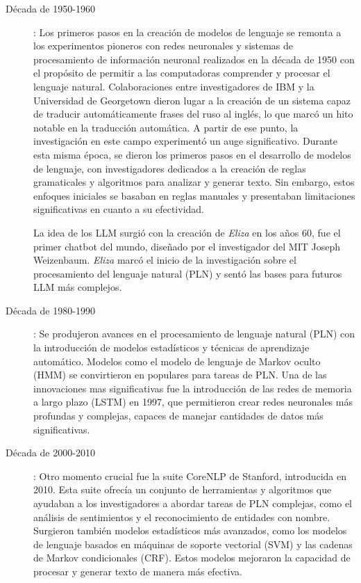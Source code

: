 \begin{description}

\item[Década de 1950-1960]: Los primeros pasos en la creación de modelos de lenguaje se remonta a los experimentos pioneros con redes neuronales y sistemas de procesamiento de información neuronal realizados en la década de 1950 con el propósito de permitir a las computadoras comprender y procesar el lenguaje natural. Colaboraciones entre investigadores de IBM y la Universidad de Georgetown dieron lugar a la creación de un sistema capaz de traducir automáticamente frases del ruso al inglés, lo que marcó un hito notable en la traducción automática. A partir de ese punto, la investigación en este campo experimentó un auge significativo. Durante esta misma época, se dieron los primeros pasos en el desarrollo de modelos de lenguaje, con investigadores dedicados a la creación de reglas gramaticales y algoritmos para analizar y generar texto. Sin embargo, estos enfoques iniciales se basaban en reglas manuales y presentaban limitaciones significativas en cuanto a su efectividad.

La idea de los LLM surgió con la creación de \textit{Eliza} en los años 60, fue el primer chatbot del mundo, diseñado por el investigador del MIT Joseph Weizenbaum. \textit{Eliza} marcó el inicio de la investigación sobre el procesamiento del lenguaje natural (PLN) y sentó las bases para futuros LLM más complejos.

\item[Década de 1980-1990]: Se produjeron avances en el procesamiento de lenguaje natural (PLN) con la introducción de modelos estadísticos y técnicas de aprendizaje automático. Modelos como el modelo de lenguaje de Markov oculto (HMM) se convirtieron en populares para tareas de PLN. Una de las innovaciones mas significativas fue la introducción de las redes de memoria a largo plazo (LSTM) en 1997, que permitieron crear redes neuronales más profundas y complejas, capaces de manejar cantidades de datos más significativas.

\item[Década de 2000-2010]: Otro momento crucial fue la suite CoreNLP de Stanford, introducida en 2010. Esta suite ofrecía un conjunto de herramientas y algoritmos que ayudaban a los investigadores a abordar tareas de PLN complejas, como el análisis de sentimientos y el reconocimiento de entidades con nombre. Surgieron también modelos estadísticos más avanzados, como los modelos de lenguaje basados en máquinas de soporte vectorial (SVM) y las cadenas de Markov condicionales (CRF). Estos modelos mejoraron la capacidad de procesar y generar texto de manera más efectiva.


\end{description}

